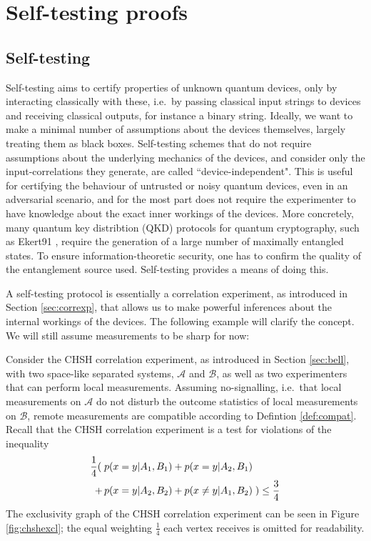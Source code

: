 \part{Self-testing proofs}
\chapter{Self-testing}
\label{sec:self-testing}

Self-testing aims to certify properties of unknown quantum devices, only by interacting classically with these, i.e.\ by passing classical input strings to devices and receiving classical outputs, for instance a binary string. Ideally, we want to make a minimal number of assumptions about the devices themselves, largely treating them as black boxes. Self-testing schemes that do not require assumptions about the underlying mechanics of the devices, and consider only the input-correlations they generate, are called ``device-independent". This is useful for certifying the behaviour of untrusted or noisy quantum devices, even in an adversarial scenario, and for the most part does not require the experimenter to have knowledge about the exact inner workings of the devices. 
More concretely, many quantum key distribtion (QKD) protocols for quantum cryptography, such as Ekert91 \cite{Ekert91}, require the generation of a large number of maximally entangled states. To ensure information-theoretic security, one has to confirm the quality of the entanglement source used. Self-testing provides a means of doing this.

A self-testing protocol is essentially a correlation experiment, as introduced in Section \ref{sec:correxp}, that allows us to make powerful inferences about the internal workings of the devices. The following example will clarify the concept. We will still assume measurements to be sharp for now:

Consider the CHSH correlation experiment, as introduced in Section \ref{sec:bell}, with two space-like separated systems, $\mathcal{A}$ and $\mathcal{B}$, as well as two experimenters that can perform local measurements. Assuming no-signalling, i.e.\ that local measurements on $\mathcal{A}$ do not disturb the outcome statistics of local measurements on $\mathcal{B}$, remote measurements are compatible according to Defintion \ref{def:compat}. Recall that the CHSH correlation experiment is a test for violations of the inequality
\begin{align*}
    \frac{1}{4}(\; & p(x=y\vert A_1,B_1)+p(x=y\vert A_2,B_1)\\ +\thinspace&p(x=y\vert A_2,B_2)+p(x\neq y \vert A_1,B_2) \;)\leq \frac{3}{4}
\end{align*}
The exclusivity graph of the CHSH correlation experiment can be seen in Figure \ref{fig:chshexcl}; the equal weighting $\frac{1}{4}$ each vertex receives is omitted for readability. 

